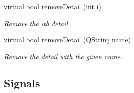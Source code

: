 \begin{DoxyCompactItemize}
virtual bool \hyperlink{class_a_w_e_1_1_media_item_a6ae48b19d0454af93f1496ad1c77e7b7}{remove\-Detail} (int i)
\begin{DoxyCompactList}\small\item\em Remove the {\ttfamily i}th detail. \end{DoxyCompactList}\item 
virtual bool \hyperlink{class_a_w_e_1_1_media_item_af42c6fe5c5ac4621d882885c74586216}{remove\-Detail} (Q\-String name)
\begin{DoxyCompactList}\small\item\em Remove the detail with the given name. \end{DoxyCompactList}\end{DoxyCompactItemize}
\subsection*{Signals}
